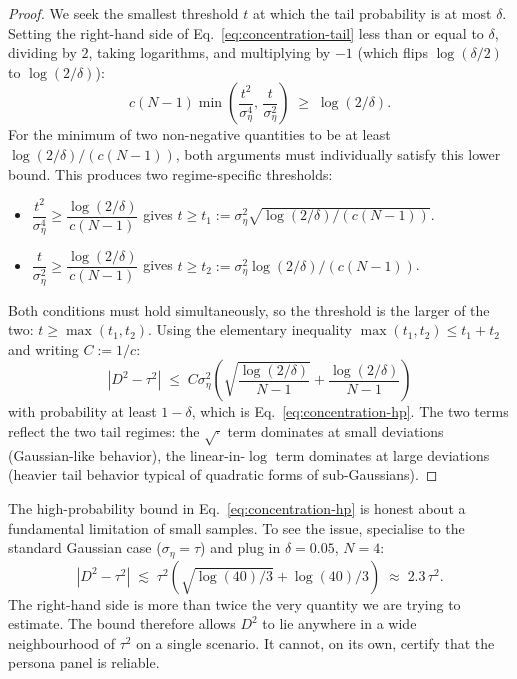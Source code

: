 \documentclass{article}
\begin{document}
\begin{proof}
We seek the smallest threshold $t$ at which the tail probability is at most $\delta$. Setting the right-hand side of Eq.~\ref{eq:concentration-tail} less than or equal to $\delta$, dividing by $2$, taking logarithms, and multiplying by $-1$ (which flips $\log(\delta/2)$ to $\log(2/\delta)$):
\begin{equation*}
c(N-1)\min\!\left(\frac{t^2}{\sigma_\eta^4},\,\frac{t}{\sigma_\eta^2}\right) \;\geq\; \log(2/\delta).
\end{equation*}
For the minimum of two non-negative quantities to be at least $\log(2/\delta)/(c(N-1))$, both arguments must individually satisfy this lower bound. This produces two regime-specific thresholds:
\begin{itemize}
\item $\dfrac{t^2}{\sigma_\eta^4} \geq \dfrac{\log(2/\delta)}{c(N-1)}$ gives $t \geq t_1 := \sigma_\eta^2\sqrt{\log(2/\delta)/(c(N-1))}$.
\item $\dfrac{t}{\sigma_\eta^2} \geq \dfrac{\log(2/\delta)}{c(N-1)}$ gives $t \geq t_2 := \sigma_\eta^2\log(2/\delta)/(c(N-1))$.
\end{itemize}
Both conditions must hold simultaneously, so the threshold is the larger of the two: $t \geq \max(t_1, t_2)$. Using the elementary inequality $\max(t_1, t_2) \leq t_1 + t_2$ and writing $C := 1/c$:
\begin{equation*}
|D^2 - \tau^2| \;\leq\; C\sigma_\eta^2 \!\left(\sqrt{\frac{\log(2/\delta)}{N-1}} + \frac{\log(2/\delta)}{N-1}\right)
\end{equation*}
with probability at least $1 - \delta$, which is Eq.~\ref{eq:concentration-hp}. The two terms reflect the two tail regimes: the $\sqrt{\cdot}$ term dominates at small deviations (Gaussian-like behavior), the linear-in-$\log$ term dominates at large deviations (heavier tail behavior typical of quadratic forms of sub-Gaussians). 
\end{proof}

The high-probability bound in Eq.~\ref{eq:concentration-hp} is honest about a fundamental limitation of small samples. To see the issue, specialise to the standard Gaussian case ($\sigma_\eta = \tau$) and plug in $\delta = 0.05$, $N = 4$:
\begin{equation*}
|D^2 - \tau^2| \;\lesssim\; \tau^2 \!\left(\sqrt{\log(40)/3} + \log(40)/3\right) \;\approx\; 2.3\,\tau^2.
\end{equation*}
The right-hand side is more than twice the very quantity we are trying to estimate. The bound therefore allows $D^2$ to lie anywhere in a wide neighbourhood of $\tau^2$ on a single scenario. It cannot, on its own, certify that the persona panel is reliable.
\end{document}
